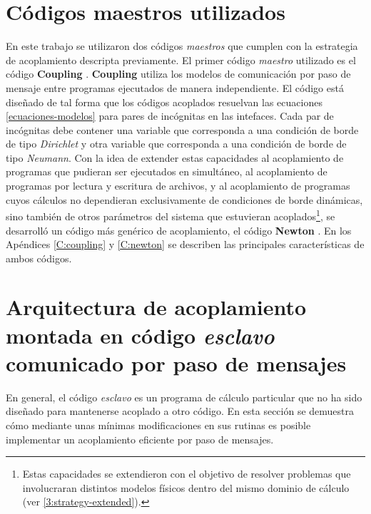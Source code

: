 \section{Códigos maestros utilizados}
\label{2:maestros}

En este trabajo se utilizaron dos códigos \textit{maestros} que cumplen con la estrategia de acoplamiento descripta previamente.
El primer código \textit{maestro} utilizado es el código \textbf{Coupling} \cite{coup-0d3d} \cite{coup-black} \cite{coup-hyd}.
\textbf{Coupling} utiliza los modelos de comunicación por paso de mensaje entre programas ejecutados de manera independiente.
El código está diseñado de tal forma que los códigos acoplados resuelvan las ecuaciones \ref{ecuaciones-modelos}
para pares de incógnitas en las intefaces. 
Cada par de incógnitas debe contener una variable que corresponda a una condición de borde de tipo \textit{Dirichlet} y otra variable que corresponda a una condición de borde de tipo \textit{Neumann}.
Con la idea de extender estas capacidades al acoplamiento de programas que pudieran ser ejecutados en simultáneo,
al acoplamiento de programas por lectura y escritura de archivos,
y al acoplamiento de programas cuyos cálculos no dependieran exclusivamente de condiciones de borde dinámicas,
sino también de otros parámetros del sistema que estuvieran acoplados\footnote{
Estas capacidades se extendieron con el objetivo de resolver problemas que involucraran distintos modelos físicos dentro del mismo dominio de cálculo (ver \ref{3:strategy-extended}).
},
se desarrolló un código más genérico de acoplamiento, el código \textbf{Newton} \cite{newton}.
En los Apéndices \ref{C:coupling} y \ref{C:newton} se describen las principales características de ambos códigos.

\section{Arquitectura de acoplamiento montada en código \textit{esclavo} comunicado por paso de mensajes}
\label{2:arquitectura-mpi}

En general, el código \textit{esclavo} es un programa de cálculo particular que no ha sido diseñado para mantenerse acoplado a otro código.
En esta sección se demuestra cómo mediante unas mínimas modificaciones en sus rutinas es posible implementar un acoplamiento eficiente por paso de mensajes.

